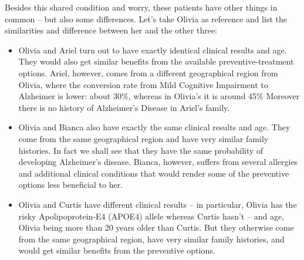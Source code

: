 \documentclass[utf8]{FrontiersinHarvard} %
\renewcommand*{\|}[1][]{\nonscript\:#1\vert\nonscript\:\mathopen{}}
\begin{document}
Besides this shared condition and worry, these patients have other things in common -- but also some differences. Let's take Olivia as reference and list the similarities and difference between her and the other three:
\begin{itemize}
\item Olivia and Ariel turn out to have exactly identical clinical results and age. They would also get similar benefits from the available preventive-treatment options. Ariel, however, comes from a different geographical region from Olivia, where the conversion rate from Mild Cognitive Impairment to Alzheimer is lower: about 30\%, whereas in Olivia's it is around 45\% \citep{petersenetal1999} Moreover there is no history of Alzheimer's Disease in Ariel's family.
\item Olivia and Bianca also have exactly the same clinical results and age. They come from the same geographical region and have very similar family histories. In fact we shall see that they have the same probability of developing Alzheimer's disease. Bianca, however, suffers from several allergies and additional clinical conditions that would render some of the preventive options less beneficial to her.
\item Olivia and Curtis have different clinical results -- in particular, Olivia has the risky Apolipoprotein-E4 (APOE4) allele \citep{liuetal2013} whereas Curtis hasn't -- and age, Olivia being more than 20 years older than Curtis. But they otherwise come from the same geographical region, have very similar family histories, and would get similar benefits from the preventive options.
\end{itemize}
\end{document}
